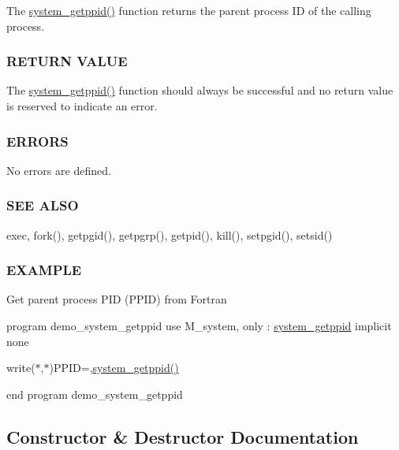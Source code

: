 The \mbox{\hyperlink{interfacem__system_1_1system__getppid_af6e12ecb746ff59fbe323d9364db41b0}{system\+\_\+getppid()}} function returns the parent process ID of the calling process.

\subsubsection*{R\+E\+T\+U\+RN V\+A\+L\+UE}

The \mbox{\hyperlink{interfacem__system_1_1system__getppid_af6e12ecb746ff59fbe323d9364db41b0}{system\+\_\+getppid()}} function should always be successful and no return value is reserved to indicate an error.

\subsubsection*{E\+R\+R\+O\+RS}

No errors are defined.

\subsubsection*{S\+EE A\+L\+SO}

exec, fork(), getpgid(), getpgrp(), getpid(), kill(), setpgid(), setsid()

\subsubsection*{E\+X\+A\+M\+P\+LE}

Get parent process P\+ID (P\+P\+ID) from Fortran

program demo\+\_\+system\+\_\+getppid use M\+\_\+system, only \+: \mbox{\hyperlink{interfacem__system_1_1system__getppid}{system\+\_\+getppid}} implicit none

write($\ast$,$\ast$)\textquotesingle{}P\+P\+ID=\textquotesingle{},\mbox{\hyperlink{interfacem__system_1_1system__getppid_af6e12ecb746ff59fbe323d9364db41b0}{system\+\_\+getppid()}}

end program demo\+\_\+system\+\_\+getppid 

\subsection{Constructor \& Destructor Documentation}
\mbox{\label{interfacem__system_1_1system__getppid_af6e12ecb746ff59fbe323d9364db41b0}} 

